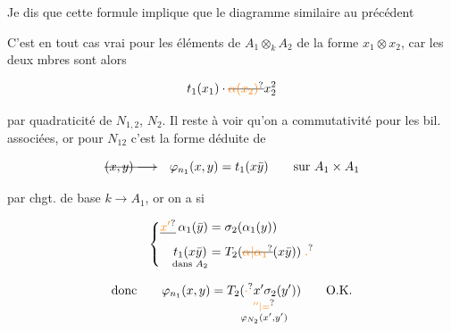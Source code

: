
Je dis que cette formule implique que le diagramme similaire au précédent



C'est en tout cas vrai pour les éléments de  $A_1\otimes_k A_2$ de la forme $x_1\otimes x_2$, car les deux mbres sont alors

\[
 t_1(x_1)\cdot\deleted{\unsure{\alpha(x_2)}}x_2^2
\]

par quadraticité de $N_{1,2}$, $N_2$. Il reste à voir qu'on a commutativité pour les  bil. associées, or pour $N_{12}$ c'est la forme déduite de

\[
 \deleted{(x,y)\longrightarrow}\quad \varphi_{n_1}(x,y)=t_1(x\bar y)\qquad\text{sur } A_1\times A_1
\]

par chgt. de base $k\longrightarrow A_1$, or on a si 

\[
 \left\{\begin{aligned}
 \deleted{\unsure{x'}}\,\alpha_1(\bar y)&=\sigma_2(\alpha_1(y))\\
 \underset{\text{dans }A_2}{t_1(x\bar y)}&=T_2(\deleted{\unsure{\alpha|\alpha_1}}(x\bar y))\; \unsure{.}
 \end{aligned}\right.
\]

\[
 \text{donc}\qquad \varphi_{n_1}(x,y)=\underset{\substack{\unsure{\mathord{''}|=}\\ \varphi_{N_2}(x',y')}}{T_2(\unsure{\cdot}x'\sigma_2(y'))}\qquad \text{O.K.}
\]


